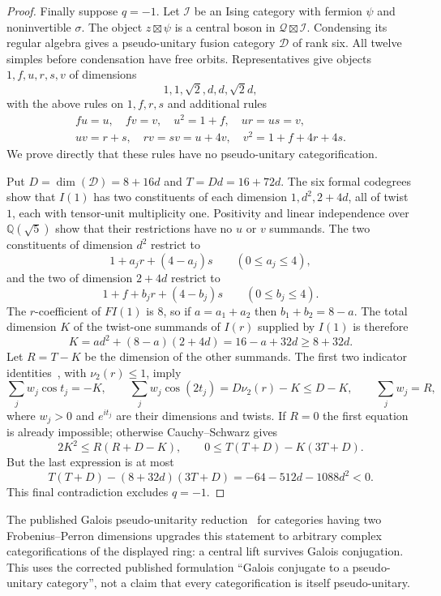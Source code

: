 \begin{proof}
Finally suppose $q=-1$. Let $\mathcal I$ be an Ising category with
fermion $\psi$ and noninvertible $\sigma$. The object
$z\boxtimes\psi$ is a central boson in
$\mathcal Q\boxtimes\mathcal I$. Condensing its regular algebra gives
a pseudo-unitary fusion category $\mathcal D$ of rank six. All twelve
simples before condensation have free orbits. Representatives give
objects $1,f,u,r,s,v$ of dimensions
\[
 1,1,\sqrt2,d,d,\sqrt2d,
\]
with the above rules on $1,f,r,s$ and additional rules
\[
 \begin{gathered}
 fu=u,\quad fv=v,\quad u^2=1+f,\quad ur=us=v,\\
 uv=r+s,\quad rv=sv=u+4v,\quad v^2=1+f+4r+4s.
 \end{gathered}
\]
We prove directly that these rules have no pseudo-unitary
categorification.

Put $D=\dim(\mathcal D)=8+16d$ and $T=Dd=16+72d$.
The six formal codegrees show that $I(1)$ has two constituents of each
dimension $1,d^2,2+4d$, all of twist $1$, each with tensor-unit
multiplicity one. Positivity and linear independence over
$\mathbb Q(\sqrt5)$ show that their restrictions have no $u$ or $v$
summands. The two constituents of dimension $d^2$ restrict to
\[
 1+a_jr+(4-a_j)s\qquad (0\le a_j\le4),
\]
and the two of dimension $2+4d$ restrict to
\[
 1+f+b_jr+(4-b_j)s\qquad (0\le b_j\le4).
\]
The $r$-coefficient of $FI(1)$ is $8$, so if $a=a_1+a_2$ then
$b_1+b_2=8-a$. The total dimension $K$ of the twist-one summands of
$I(r)$ supplied by $I(1)$ is therefore
\[
 K=a d^2+(8-a)(2+4d)=16-a+32d\ge8+32d.
\]
Let $R=T-K$ be the dimension of the other summands. The first two
indicator identities~\cite{NgIndicators}, with $\nu_2(r)\le1$, imply
\[
 \sum_j w_j\cos t_j=-K,\qquad
 \sum_j w_j\cos(2t_j)=D\nu_2(r)-K\le D-K,
 \qquad \sum_j w_j=R,
\]
where $w_j>0$ and $e^{it_j}$ are their dimensions and twists.
If $R=0$ the first equation is already impossible; otherwise
Cauchy--Schwarz gives
\[
 2K^2\le R(R+D-K),\qquad
 0\le T(T+D)-K(3T+D).
\]
But the last expression is at most
\[
 T(T+D)-(8+32d)(3T+D)
 =-64-512d-1088d^2<0.
\]
This final contradiction excludes $q=-1$.
\end{proof}

\begin{remark}
The published Galois pseudo-unitarity reduction~\cite[Lemma~3.1]{SchNear}
for categories having
two Frobenius--Perron dimensions upgrades this statement to arbitrary
complex categorifications of the displayed ring: a central lift survives
Galois conjugation. This uses the corrected published formulation
``Galois conjugate to a pseudo-unitary category'', not a claim that every
categorification is itself pseudo-unitary.
\end{remark}


